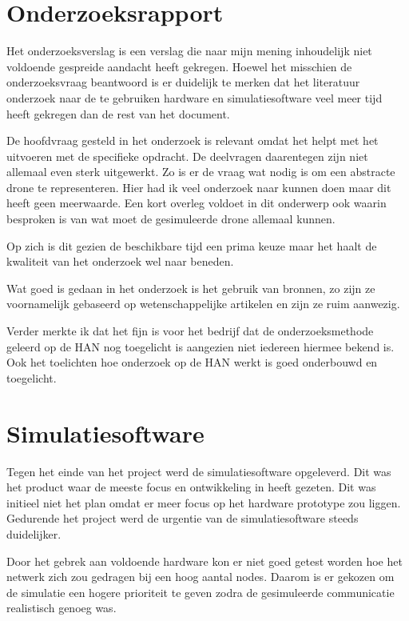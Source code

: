 \documentclass[a4paper, 11pt, oneside]{report}
\begin{document}
\section{Onderzoeksrapport}\label{sec:onderzoeksrapport}

Het onderzoeksverslag is een verslag die naar mijn mening inhoudelijk niet voldoende gespreide aandacht heeft gekregen. Hoewel het misschien de onderzoeksvraag beantwoord is er duidelijk te merken dat het literatuur onderzoek naar de te gebruiken hardware en simulatiesoftware veel meer tijd heeft gekregen dan de rest van het document.

De hoofdvraag gesteld in het onderzoek is relevant omdat het helpt met het uitvoeren met de specifieke opdracht.
De deelvragen daarentegen zijn niet allemaal even sterk uitgewerkt. 
Zo is er de vraag wat nodig is om een abstracte drone te representeren. 
Hier had ik veel onderzoek naar kunnen doen maar dit heeft geen meerwaarde. 
Een kort overleg voldoet in dit onderwerp ook waarin besproken is van wat moet de gesimuleerde drone allemaal kunnen.

Op zich is dit gezien de beschikbare tijd een prima keuze maar het haalt de kwaliteit van het onderzoek wel naar beneden.

Wat goed is gedaan in het onderzoek is het gebruik van bronnen, zo zijn ze voornamelijk gebaseerd op wetenschappelijke artikelen en zijn ze ruim aanwezig.

Verder merkte ik dat het fijn is voor het bedrijf dat de onderzoeksmethode geleerd op de HAN nog toegelicht is aangezien niet iedereen hiermee bekend is. Ook het toelichten hoe onderzoek op de HAN werkt is goed onderbouwd en toegelicht.
  


\section{Simulatiesoftware}\label{sec:simulatiesoftware}
Tegen het einde van het project werd de simulatiesoftware opgeleverd. 
Dit was het product waar de meeste focus en ontwikkeling in heeft gezeten.
Dit was initieel niet het plan omdat er meer focus op het hardware prototype zou liggen.
Gedurende het project werd de urgentie van de simulatiesoftware steeds duidelijker.

Door het gebrek aan voldoende hardware kon er niet goed getest worden hoe het netwerk zich zou gedragen bij een hoog aantal nodes.
Daarom is er gekozen om de simulatie een hogere prioriteit te geven zodra de gesimuleerde communicatie realistisch genoeg was.
\end{document}
